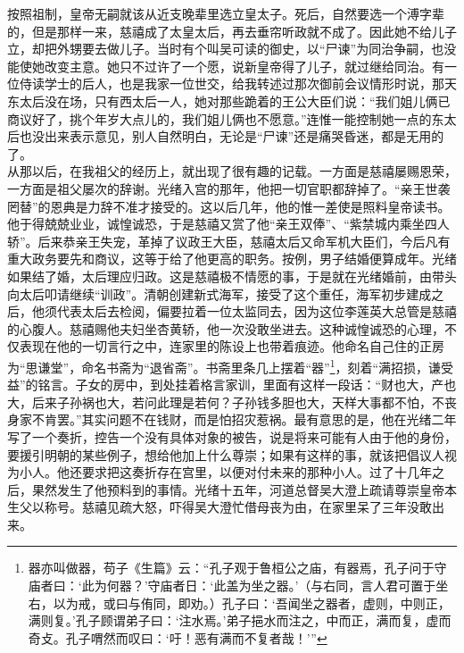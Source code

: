   按照祖制，皇帝无嗣就该从近支晚辈里选立皇太子。死后，自然要选一个溥字辈的，但是那样一来，慈禧成了太皇太后，再去垂帘听政就不成了。因此她不给儿子立，却把外甥要去做儿子。当时有个叫吴可读的御史，以“尸谏”为同治争嗣，也没能使她改变主意。她只不过许了一个愿，说新皇帝得了儿子，就过继给同治。有一位侍读学士的后人，也是我家一位世交，给我转述过那次御前会议情形时说，那天东太后没在场，只有西太后一人，她对那些跪着的王公大臣们说：“我们姐儿俩已商议好了，挑个年岁大点儿的，我们姐儿俩也不愿意。”连惟一能控制她一点的东太后也没出来表示意见，别人自然明白，无论是“尸谏”还是痛哭昏迷，都是无用的了。\\

  从那以后，在我祖父的经历上，就出现了很有趣的记载。一方面是慈禧屡赐恩荣，一方面是祖父屡次的辞谢。光绪入宫的那年，他把一切官职都辞掉了。“亲王世袭罔替”的恩典是力辞不准才接受的。这以后几年，他的惟一差使是照料皇帝读书。他于得兢兢业业，诚惶诚恐，于是慈禧又赏了他“亲王双俸”、“紫禁城内乘坐四人轿”。后来恭亲王失宠，革掉了议政王大臣，慈禧太后又命军机大臣们，今后凡有重大政务要先和商议，这等于给了他更高的职务。按例，男子结婚便算成年。光绪如果结了婚，太后理应归政。这是慈禧极不情愿的事，于是就在光绪婚前，由带头向太后叩请继续“训政”。清朝创建新式海军，接受了这个重任，海军初步建成之后，他须代表太后去检阅，偏要拉着一位太监同去，因为这位李莲英大总管是慈禧的心腹人。慈禧赐他夫妇坐杏黄轿，他一次没敢坐进去。这种诚惶诚恐的心理，不仅表现在他的一切言行之中，连家里的陈设上也带着痕迹。他命名自己住的正房为“思谦堂”，命名书斋为“退省斋”。书斋里条几上摆着“器”\footnote{器亦叫做器，苟子《生篇》云：“孔子观于鲁桓公之庙，有器焉，孔子问于守庙者曰：‘此为何器？’守庙者日：‘此盖为坐之器。’（与右同，言人君可置于坐右，以为戒，或曰与侑同，即劝。）孔子曰：‘吾闻坐之器者，虚则，中则正，满则复。’孔子顾谓弟子曰：‘注水焉。’弟子挹水而注之，中而正，满而复，虚而奇攴。孔子喟然而叹曰：‘吁！恶有满而不复者哉！’”}，刻着“满招损，谦受益”的铭言。子女的房中，到处挂着格言家训，里面有这样一段话：“财也大，产也大，后来子孙祸也大，若问此理是若何？子孙钱多胆也大，天样大事都不怕，不丧身家不肯罢。”其实问题不在钱财，而是怕招灾惹祸。最有意思的是，他在光绪二年写了一个奏折，控告一个没有具体对象的被告，说是将来可能有人由于他的身份，要援引明朝的某些例子，想给他加上什么尊崇；如果有这样的事，就该把倡议人视为小人。他还要求把这奏折存在宫里，以便对付未来的那种小人。过了十几年之后，果然发生了他预料到的事情。光绪十五年，河道总督吴大澄上疏请尊崇皇帝本生父以称号。慈禧见疏大怒，吓得吴大澄忙借母丧为由，在家里呆了三年没敢出来。\\

